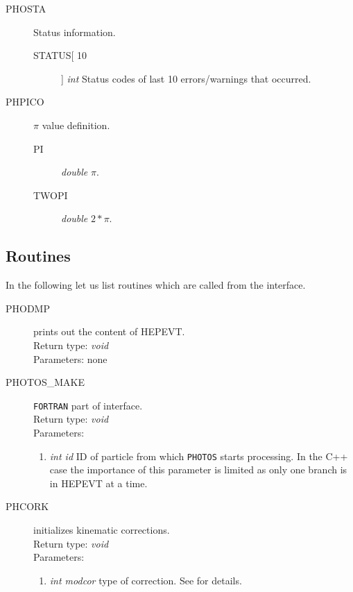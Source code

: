 \documentclass[]{Photos_interface_design}
\begin{document}
\begin{description}
\item[PHOSTA] Status information.
    \begin{description}
    \item[STATUS[ 10]]  \textit{int} Status codes of last 10 errors/warnings
    that occurred.
    \end{description}
\end{description}

\begin{description}
\item[PHPICO] $\pi$ value definition.
    \begin{description}
    \item[PI]  \textit{double} $\pi$.
	\item[TWOPI]  \textit{double} $2*\pi$.
    \end{description}
\end{description}

\subsection{Routines}

In the following let us list routines which are called from the interface.

\begin{description}
\item[PHODMP] prints out the content of HEPEVT. \\
  Return type: \textit{void} \\
  Parameters: none
\end{description}

\begin{description}
\item[PHOTOS\_MAKE] {\tt FORTRAN} part of interface. \\
  Return type: \textit{void} \\
  Parameters:
  \begin{enumerate}
    \item \textit {int id} ID of particle from which {\tt PHOTOS} starts processing. In the C++ case the importance of this parameter is limited as only one branch is in HEPEVT at a time.
  \end{enumerate}
\end{description}

\begin{description}
\item[PHCORK] initializes kinematic corrections. \\
  Return type: \textit{void} \\
  Parameters:
  \begin{enumerate}
    \item \textit {int modcor} type of correction. See \cite{Golonka:2005pn}  for details.
  \end{enumerate}
\end{description}
\end{document}
